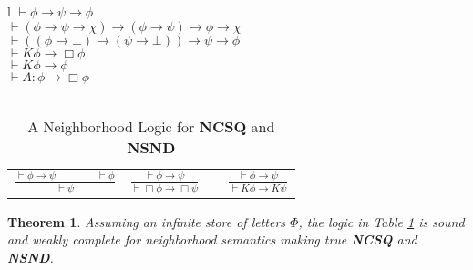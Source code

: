 \documentclass{acmconf}
\newcommand{\tmstrong}[1]{\textbf{#1}}
\newcommand{\tmtextbf}[1]{{\bfseries{#1}}}
\newtheorem{theorem}{Theorem}
\begin{document}
\begin{table}[h]
  \begin{tabular}{l}
    $\vdash \phi \rightarrow \psi \rightarrow \phi$\\
    $\vdash (\phi \rightarrow \psi \rightarrow \chi) \rightarrow (\phi
    \rightarrow \psi) \rightarrow \phi \rightarrow \chi$\\
    $\vdash ((\phi \rightarrow \bot) \rightarrow (\psi \rightarrow \bot))
    \rightarrow \psi \rightarrow \phi$\\
    $\vdash K \phi \rightarrow \Box \phi$\\
    $\vdash K \phi \rightarrow \phi$\\
    $\vdash A : \phi \rightarrow \Box \phi$\\
    \\
    \begin{tabular}{llll}
      $\frac{\vdash \phi \rightarrow \psi \hspace{4em} \vdash \phi}{\vdash
      \psi}$ & {\hspace{6em}}$\frac{\vdash \phi \rightarrow \psi}{\vdash \Box
      \phi \rightarrow \Box \psi}$ & {\hspace{6em}} & $\frac{\vdash \phi
      \rightarrow \psi}{\vdash K \phi \rightarrow K \psi}$
    \end{tabular}
  \end{tabular}
  \caption{\label{logic3}A Neighborhood Logic for \tmtextbf{NCSQ} and
  {\tmstrong{NSND}}}
\end{table}

\begin{theorem}
  Assuming an infinite store of letters $\Phi$, the logic in Table
  \ref{logic3} is sound and weakly complete for neighborhood semantics making
  true \tmtextbf{NCSQ} and \tmtextbf{NSND}.
\end{theorem}
\end{document}
